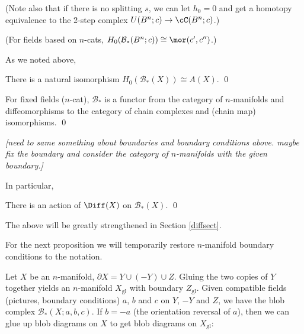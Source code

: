 \documentclass[11pt,leqno]{amsart}
\def\bc{{\mathcal B}}
\def\bd{\partial}
\def\sgl{_\mathrm{gl}}
\def\nn#1{{{\it \small [#1]}}}
\begin{document}
(Note also that if there is no splitting $s$, we can let $h_0 = 0$ and get a homotopy
equivalence to the 2-step complex $U(B^n; c) \to \cC(B^n; c)$.)

(For fields based on $n$-cats, $H_0(\bc_*(B^n; c)) \cong \mor(c', c'')$.)

\medskip

As we noted above,
\begin{prop}
There is a natural isomorphism $H_0(\bc_*(X)) \cong A(X)$.
\qed
\end{prop}







\begin{prop}
For fixed fields ($n$-cat), $\bc_*$ is a functor from the category
of $n$-manifolds and diffeomorphisms to the category of chain complexes and
(chain map) isomorphisms.
\qed
\end{prop}

\nn{need to same something about boundaries and boundary conditions above.
maybe fix the boundary and consider the category of $n$-manifolds with the given boundary.}


In particular,
\begin{prop}  \label{diff0prop}
There is an action of $\Diff(X)$ on $\bc_*(X)$.
\qed
\end{prop}

The above will be greatly strengthened in Section \ref{diffsect}.

\medskip

For the next proposition we will temporarily restore $n$-manifold boundary
conditions to the notation.

Let $X$ be an $n$-manifold, $\bd X = Y \cup (-Y) \cup Z$.
Gluing the two copies of $Y$ together yields an $n$-manifold $X\sgl$
with boundary $Z\sgl$.
Given compatible fields (pictures, boundary conditions) $a$, $b$ and $c$ on $Y$, $-Y$ and $Z$,
we have the blob complex $\bc_*(X; a, b, c)$.
If $b = -a$ (the orientation reversal of $a$), then we can glue up blob diagrams on
$X$ to get blob diagrams on $X\sgl$:
\end{document}
